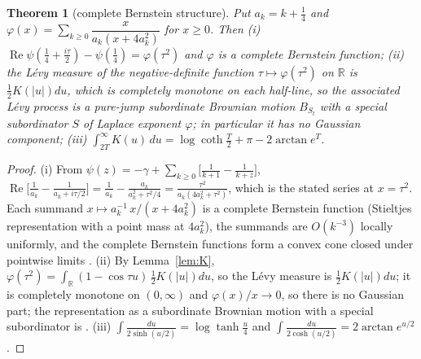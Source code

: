 \documentclass[11pt]{amsart}
\newtheorem{theorem}{Theorem}[section]
\theoremstyle{definition}
\theoremstyle{remark}
\newcommand{\R}{\mathbb R}
\newcommand{\Rel}{\operatorname{Re}}
\begin{document}
\begin{theorem}[complete Bernstein structure]\label{thm:S}
Put $a_k=k+\frac14$ and $\varphi(x)=\sum_{k\ge0}\dfrac{x}{a_k(x+4a_k^2)}$ for $x\ge0$. Then
\emph{(i)} $\Rel\psi(\frac14+\frac{i\tau}2)-\psi(\frac14)=\varphi(\tau^2)$ and $\varphi$ is a
complete Bernstein function; \emph{(ii)} the L\'evy measure of the negative-definite function
$\tau\mapsto\varphi(\tau^2)$ on $\R$ is $\frac12K(|u|)du$, which is completely monotone on each
half-line, so the associated L\'evy process is a pure-jump subordinate Brownian motion
$B_{S_t}$ with a special subordinator $S$ of Laplace exponent $\varphi$; in particular it has no
Gaussian component; \emph{(iii)} $\int_{2T}^\infty K(u)\,du=\log\coth\frac T2+\pi-2\arctan e^{T}$.
\end{theorem}
\begin{proof}
(i) From $\psi(z)=-\gamma+\sum_{k\ge0}\big[\frac1{k+1}-\frac1{k+z}\big]$,
$\Rel\big[\frac1{a_k}-\frac1{a_k+i\tau/2}\big]=\frac1{a_k}-\frac{a_k}{a_k^2+\tau^2/4}
=\frac{\tau^2}{a_k(4a_k^2+\tau^2)}$, which is the stated series at $x=\tau^2$. Each summand
$x\mapsto a_k^{-1}\,x/(x+4a_k^2)$ is a complete Bernstein function (Stieltjes representation with
a point mass at $4a_k^2$), the summands are $O(k^{-3})$ locally uniformly, and the complete
Bernstein functions form a convex cone closed under pointwise limits
\cite[Ch.~6--7]{SSV2012}. (ii) By Lemma~\ref{lem:K}, $\varphi(\tau^2)=\int_\R(1-\cos\tau u)\,
\frac12K(|u|)du$, so the L\'evy measure is $\frac12K(|u|)du$; it is completely monotone on
$(0,\infty)$ and $\varphi(x)/x\to0$, so there is no Gaussian part; the representation as a
subordinate Brownian motion with a special subordinator is \cite[Thm.~13.10, Cor.~13.12]{SSV2012}.
(iii) $\int\frac{du}{2\sinh(u/2)}=\log\tanh\frac u4$ and $\int\frac{du}{2\cosh(u/2)}=2\arctan e^{u/2}$.
\end{proof}
\end{document}
